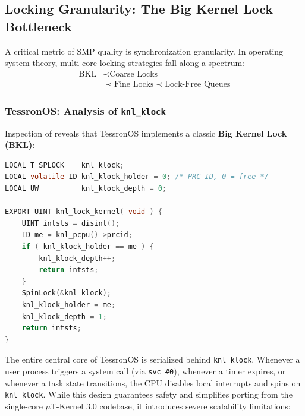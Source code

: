 \documentclass[10pt,journal,compsoc,twocolumn]{article}
\begin{document}
\subsection{Locking Granularity: The Big Kernel Lock Bottleneck}

A critical metric of SMP quality is synchronization granularity. In operating system theory, multi-core locking strategies fall along a spectrum:
\begin{equation}
\begin{split}
\text{BKL} &\prec \text{Coarse Locks} \\
  &\prec \text{Fine Locks} \prec \text{Lock-Free Queues}
\end{split}
\end{equation}

\subsubsection{TessronOS: Analysis of \texttt{knl\_klock}}
Inspection of  reveals that TessronOS implements a classic \textbf{Big Kernel Lock (BKL)}:
\begin{lstlisting}[language=C]
LOCAL T_SPLOCK    knl_klock;
LOCAL volatile ID knl_klock_holder = 0; /* PRC ID, 0 = free */
LOCAL UW          knl_klock_depth = 0;

EXPORT UINT knl_lock_kernel( void ) {
    UINT intsts = disint();
    ID me = knl_pcpu()->prcid;
    if ( knl_klock_holder == me ) {
        knl_klock_depth++;
        return intsts;
    }
    SpinLock(&knl_klock);
    knl_klock_holder = me;
    knl_klock_depth = 1;
    return intsts;
}
\end{lstlisting}

The entire central core of TessronOS is serialized behind \texttt{knl\_klock}. Whenever a user process triggers a system call (via \texttt{svc \#0}), whenever a timer expires, or whenever a task state transitions, the CPU disables local interrupts and spins on \texttt{knl\_klock}. While this design guarantees safety and simplifies porting from the single-core $\mu$T-Kernel 3.0 codebase, it introduces severe scalability limitations:
\end{document}
